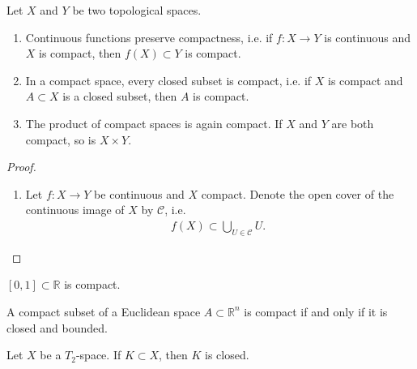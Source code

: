\begin{thmbox}
    \begin{proposition}
        Let \(X\) and \(Y\) be two topological spaces.
        \begin{enumerate}
            \item Continuous functions preserve compactness, i.e. if \(f: X \longrightarrow Y\) is continuous and \(X\) is compact, then \(f(X) \subset Y\) is compact.
            \item In a compact space, every closed subset is compact, i.e. if \(X\) is compact and \(A \subset X\) is a closed subset, then \(A\) is compact.
            \item The product of compact spaces is again compact. If \(X\) and \(Y\) are both compact, so is \(X \times Y\).
        \end{enumerate}
    \end{proposition}
\end{thmbox}

\begin{proof}
    \begin{enumerate}
        \item Let \(f: X \longrightarrow Y\) be continuous and \(X\) compact. Denote the open cover of the continuous image of \(X\) by \(\mathcal{C}\), i.e.
        \begin{align*}
            f(X) \subset \bigcup_{U \in \mathcal{C}} U \text{.  }
        \end{align*}
    \end{enumerate}
\end{proof}

\begin{thmbox}
    \begin{lemma}
        \([0, 1] \subset \mathbb{R}\) is {\color{maththen}compact}.
    \end{lemma}
\end{thmbox}

\begin{thmbox}
    \begin{theorem}
        A compact subset of a Euclidean space \(A \subset \mathbb{R}^n\) is compact if and only if it is closed and bounded.
    \end{theorem}
\end{thmbox}

\begin{thmbox}
    \begin{proposition}
        Let \(X\) be a \(T_2\)-space. If \(K \subset X\), then \(K\) is closed.
    \end{proposition}
\end{thmbox}